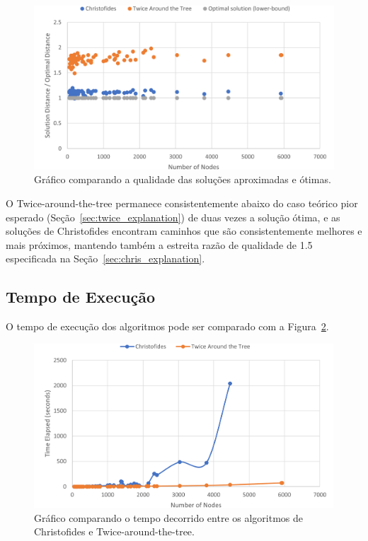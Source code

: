 \begin{figure}[ht]
\centering
\includegraphics[height=.325\textheight]{quality_ratio.png}
\caption{Gráfico comparando a qualidade das soluções aproximadas e ótimas.}
\label{fig:quality_ratio}
\end{figure}

O Twice-around-the-tree permanece consistentemente abaixo do caso teórico pior esperado (Seção~\ref{sec:twice_explanation}) de duas vezes a solução ótima, e as soluções de Christofides encontram caminhos que são consistentemente melhores e mais próximos, mantendo também a estreita razão de qualidade de 1.5 especificada na Seção~\ref{sec:chris_explanation}.

\subsection{Tempo de Execução} \label{sec:exp_time}

O tempo de execução dos algoritmos pode ser comparado com a Figura~\ref{fig:exec_time}.

\begin{figure}[ht]
\centering
\includegraphics[height=.325\textheight]{execution_time_comparison.png}
\caption{Gráfico comparando o tempo decorrido entre os algoritmos de Christofides e Twice-around-the-tree.}
\label{fig:exec_time}
\end{figure}

